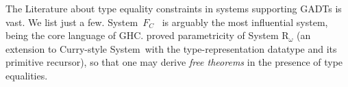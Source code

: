 The Literature about type equality constraints in systems supporting
GADTs is vast. We list just a few. System~$F_{\!C}$~\cite{Sulzmann07} is
arguably the most influential system, being the core language of GHC. 
\citet{VytWei10} proved parametricity of
System $\mathrm{R}_\omega$ \cite{Crary98} (an extension to Curry-style
System~\Fw with the type-representation datatype and its primitive recursor),
so that one may derive \emph{free theorems} \cite{Wadler89free}
in the presence of type equalities.


